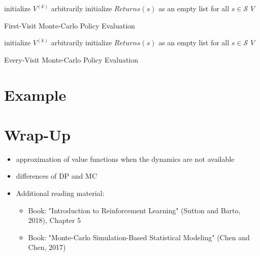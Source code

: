 	\begin{algorithm}  \DontPrintSemicolon
		initialize \(V^{(k)}\) arbitrarily \;
		initialize \(\mathit{Returns}(s)\) as an empty list for all \(s \in \mathcal{S}\) \;
		\Return \(V\) \;
		\caption{First-Visit Monte-Carlo Policy Evaluation}
		\label{alg:firstVisitMCPE}
	\end{algorithm}
	\begin{algorithm}  \DontPrintSemicolon
		initialize \(V^{(k)}\) arbitrarily \;
		initialize \(\mathit{Returns}(s)\) as an empty list for all \(s \in \mathcal{S}\) \;
		\Return \(V\) \;
		\caption{Every-Visit Monte-Carlo Policy Evaluation}
		\label{alg:everyVisitMCPE}
	\end{algorithm}

	\section{Example}

	\section{Wrap-Up}
		\begin{itemize}
			\item approximation of value functions when the dynamics are not available
			\item differences of \ac{DP} and \ac{MC}
			\item Additional reading material:
				\begin{itemize}
					\item Book: "Introduction to Reinforcement Learning" (Sutton and Barto, 2018), Chapter 5  %
					\item Book: "Monte-Carlo Simulation-Based Statistical Modeling" (Chen and Chen, 2017)
				\end{itemize}
		\end{itemize}

